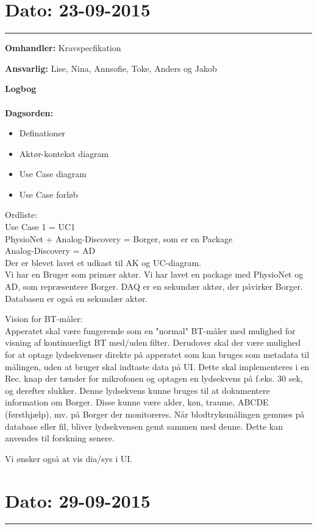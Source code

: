 \section{Dato: 23-09-2015 }
\hrule

\textbf{Omhandler:} Kravspecfikation 

\textbf{Ansvarlig:} Lise, Nina, Annsofie, Toke, Anders og Jakob

\textbf{Logbog}
\\
\\
\textbf{Dagsorden:}
\begin{itemize}
	\item Definationer
	\item Aktør-kontekst diagram
	\item Use Case diagram
	\item Use Case forløb
\end{itemize}

Ordliste:\\ 
Use Case 1 = UC1 \\
PhysioNet + Analog-Discovery = Borger, som er en Package \\
Analog-Discovery = AD \\

Der er blevet lavet et udkast til AK og UC-diagram. \\
Vi har en Bruger som primær aktør. Vi har lavet en package med PhysioNet og AD, som repræsentere Borger. DAQ er en sekundær aktør, der påvirker Borger. Databasen er også en sekundær aktør. 

Vision for BT-måler:\\
Apperatet skal være fungerende som en "normal" BT-måler med mulighed for visning af kontinuerligt BT med/uden filter. Derudover skal der være mulighed for at optage lydsekvenser direkte på apperatet som kan bruges som metadata til målingen, uden at bruger skal indtaste data på UI. Dette skal implementeres i en Rec. knap der tænder for mikrofonen og optagen en lydsekvens på f.eks. 30 sek, og derefter slukker. Denne lydsekvens kunne bruges til at dokumentere information om Borger. Disse kunne være alder, køn, traume, ABCDE (førsthjælp), mv. på Borger der monitoreres. 
Når blodtryksmålingen gemmes på database eller fil, bliver lydsekvensen gemt sammen med denne. Dette kan anvendes til forskning senere. 

Vi ønsker også at vis dia/sys i UI. 


	

\section{Dato: 29-09-2015 }
\hrule


